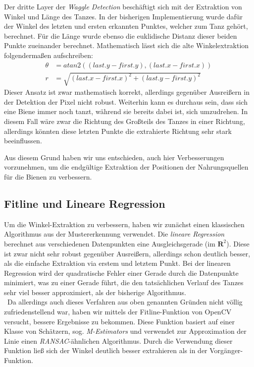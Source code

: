 \documentclass[11pt,a4paper]{article}
\begin{document}
Der dritte Layer der \textit{Waggle Detection} beschäftigt sich mit der Extraktion von Winkel und Länge des Tanzes.
In der bisherigen Implementierung wurde dafür der Winkel des letzten und ersten erkannten Punktes, welcher zum Tanz gehört, berechnet. Für die Länge wurde ebenso die euklidische Distanz dieser beiden Punkte zueinander berechnet.
Mathematisch lässt sich die alte Winkelextraktion folgendermaßen aufschreiben:
\begin{align}
\theta &= atan2((last.y-first.y), (last.x-first.x)) \\
r &= \sqrt{(last.x-first.x)^2 + (last.y-first.y)^2}
\end{align}
Dieser Ansatz ist zwar mathematisch korrekt, allerdings gegenüber Ausreißern in der Detektion der Pixel nicht robust.
Weiterhin kann es durchaus sein, dass sich eine Biene immer noch tanzt, während sie bereits dabei ist, sich umzudrehen. In diesem Fall wäre zwar die Richtung des Großteils des Tanzes in einer Richtung, allerdings könnten diese letzten Punkte die extrahierte Richtung sehr stark beeinflussen.

Aus diesem Grund haben wir uns entschieden, auch hier Verbesserungen vorzunehmen, um die endgültige Extraktion der Positionen der Nahrungsquellen für die Bienen zu verbessern.

\subsection{Fitline und Lineare Regression}

Um die Winkel-Extraktion zu verbessern, haben wir zunächst einen klassischen Algorithmus aus der Mustererkennung verwendet. Die \textit{lineare Regression} berechnet aus verschiedenen Datenpunkten eine Ausgleichsgerade (im $\mathbf{R}^2$). Diese ist zwar nicht sehr robust gegenüber Ausreißern, allerdings schon deutlich besser, als die einfache Extraktion via erstem und letztem Punkt.
Bei der linearen Regression wird der quadratische Fehler einer Gerade durch die Datenpunkte minimiert, was zu einer Gerade führt, die den tatsächlichen Verlauf des Tanzes sehr viel besser approximiert, als der bisherige Algorithmus.\\\
Da allerdings auch dieses Verfahren aus oben genannten Gründen nicht völlig zufriedenstellend war, haben wir mittels der Fitline-Funktion von OpenCV versucht, bessere Ergebnisse zu bekommen.
Diese Funktion basiert auf einer Klasse von Schätzern, sog. \textit{M-Estimators} und verwendet zur Approximation der Linie einen \textit{RANSAC}-ähnlichen Algorithmus.
Durch die Verwendung dieser Funktion ließ sich der Winkel deutlich besser extrahieren als in der Vorgänger-Funktion.
\end{document}
